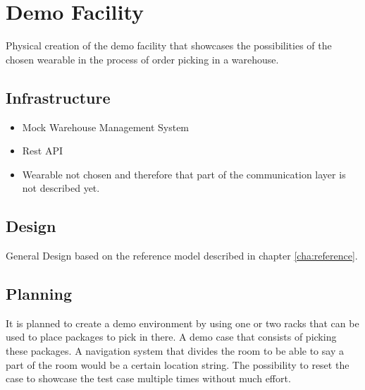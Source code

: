 \chapter{Demo Facility}\label{cha:demoFacility}
Physical creation of the demo facility that showcases the possibilities of the chosen wearable in the process of order picking in a warehouse.

\section{Infrastructure}
\begin{itemize}
	\item Mock Warehouse Management System
	\item Rest API
	\item Wearable not chosen and therefore that part of the communication layer is not described yet.
\end{itemize}
\section{Design}
General Design based on the reference model described in chapter \ref{cha:reference}. 
\section{Planning}
It is planned to create a demo environment by using one or two racks that can be used to place packages to pick in there. A demo case that consists of picking these packages. A navigation system that divides the room to be able to say a part of the room would be a certain location string. The possibility to reset the case to showcase the test case multiple times without much effort. 